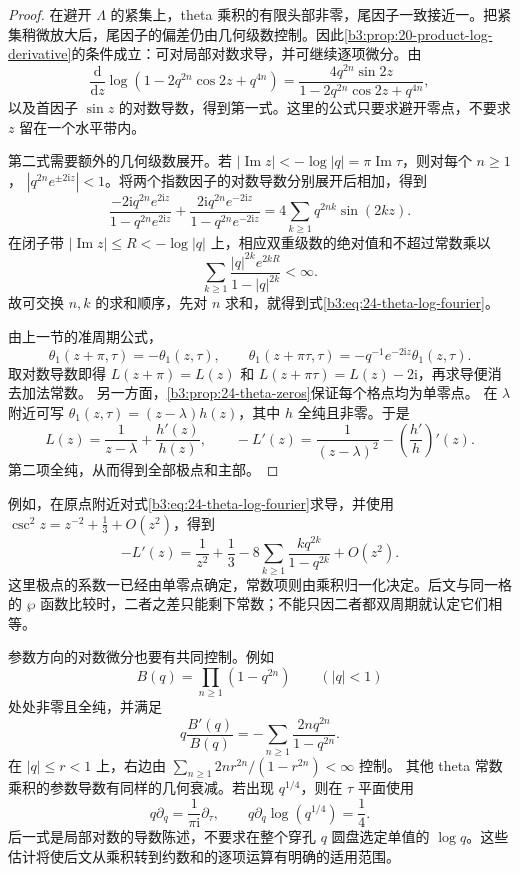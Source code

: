 \begin{proof}
在避开 \(\Lambda\) 的紧集上，theta 乘积的有限头部非零，尾因子一致接近一。把紧集稍微放大后，尾因子的偏差仍由几何级数控制。因此\cref{b3:prop:20-product-log-derivative}的条件成立：可对局部对数求导，并可继续逐项微分。由
\[
 \frac{\mathrm d}{\mathrm dz}
   \log(1-2q^{2n}\cos2z+q^{4n})
 =\frac{4q^{2n}\sin2z}
        {1-2q^{2n}\cos2z+q^{4n}},
\]
以及首因子 \(\sin z\) 的对数导数，得到第一式。这里的公式只要求避开零点，不要求 \(z\) 留在一个水平带内。

第二式需要额外的几何级数展开。若
\(|\operatorname{Im}z|<-\log|q|=\pi\operatorname{Im}\tau\)，则对每个 \(n\ge1\)，
\(|q^{2n}e^{\pm2\mathrm iz}|<1\)。将两个指数因子的对数导数分别展开后相加，得到
\[
 \frac{-2\mathrm i q^{2n}e^{2\mathrm iz}}
           {1-q^{2n}e^{2\mathrm iz}}
 +\frac{2\mathrm i q^{2n}e^{-2\mathrm iz}}
           {1-q^{2n}e^{-2\mathrm iz}}
 =4\sum_{k\ge1}q^{2nk}\sin(2kz).
\]
在闭子带 \(|\operatorname{Im}z|\le R<-\log|q|\) 上，相应双重级数的绝对值和不超过常数乘以
\[
 \sum_{k\ge1}
   \frac{|q|^{2k}e^{2kR}}{1-|q|^{2k}}<\infty.
\]
故可交换 \(n,k\) 的求和顺序，先对 \(n\) 求和，就得到式\eqref{b3:eq:24-theta-log-fourier}。

由上一节的准周期公式，
\[
 \theta_1(z+\pi,\tau)=-\theta_1(z,\tau),\qquad
 \theta_1(z+\pi\tau,\tau)
 =-q^{-1}e^{-2\mathrm iz}\theta_1(z,\tau).
\]
取对数导数即得 \(L(z+\pi)=L(z)\) 和
\(L(z+\pi\tau)=L(z)-2\mathrm i\)，再求导便消去加法常数。
另一方面，\cref{b3:prop:24-theta-zeros}保证每个格点均为单零点。
在 \(\lambda\) 附近可写
\(\theta_1(z,\tau)=(z-\lambda)h(z)\)，其中 \(h\) 全纯且非零。于是
\[
 L(z)=\frac1{z-\lambda}+\frac{h'(z)}{h(z)},\qquad
 -L'(z)=\frac1{(z-\lambda)^2}
          -\left(\frac{h'}h\right)'(z).
\]
第二项全纯，从而得到全部极点和主部。
\end{proof}

例如，在原点附近对式\eqref{b3:eq:24-theta-log-fourier}求导，并使用
\(\csc^2z=z^{-2}+\tfrac13+O(z^2)\)，得到
\begin{equation}\label{b3:eq:24-theta-local-part}
 -L'(z)=\frac1{z^2}+\frac13
       -8\sum_{k\ge1}\frac{kq^{2k}}{1-q^{2k}}+O(z^2).
\end{equation}
这里极点的系数一已经由单零点确定，常数项则由乘积归一化决定。后文与同一格的 \(\wp\) 函数比较时，二者之差只能剩下常数；不能只因二者都双周期就认定它们相等。

参数方向的对数微分也要有共同控制。例如
\[
 B(q)=\prod_{n\ge1}(1-q^{2n})\qquad(|q|<1)
\]
处处非零且全纯，并满足
\[
 q\frac{B'(q)}{B(q)}
 =-\sum_{n\ge1}\frac{2nq^{2n}}{1-q^{2n}}.
\]
在 \(|q|\le r<1\) 上，右边由
\(\sum_{n\ge1}2nr^{2n}/(1-r^{2n})<\infty\) 控制。
其他 theta 常数乘积的参数导数有同样的几何衰减。若出现
\(q^{1/4}\)，则在 \(\tau\) 平面使用
\[
 q\partial_q=\frac1{\pi\mathrm i}\partial_\tau,
 \qquad q\partial_q\log(q^{1/4})=\frac14.
\]
后一式是局部对数的导数陈述，不要求在整个穿孔 \(q\) 圆盘选定单值的 \(\log q\)。这些估计将使后文从乘积转到约数和的逐项运算有明确的适用范围。
